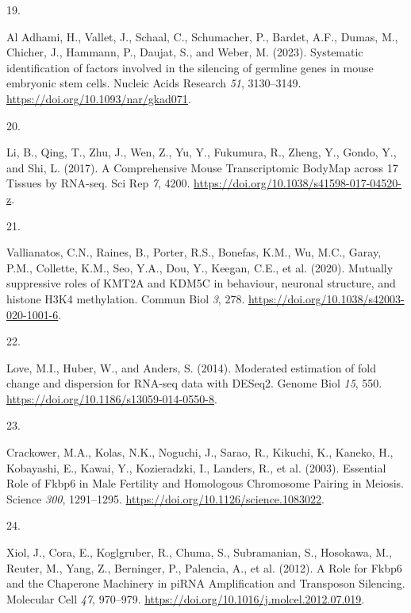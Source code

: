 \documentclass[
]{article}
\newlength{\cslhangindent}
\newlength{\csllabelwidth}
\newlength{\cslentryspacingunit} %
\newenvironment{CSLReferences}[2] %
 {%
  \setlength{\parindent}{0pt}
  \ifodd #1
  \let\oldpar\par
  \def\par{\hangindent=\cslhangindent\oldpar}
  \fi
  \setlength{\parskip}{#2\cslentryspacingunit}
 }%
 {}
\newcommand{\CSLLeftMargin}[1]{\parbox[t]{\csllabelwidth}{#1}}
\newcommand{\CSLRightInline}[1]{\parbox[t]{\linewidth - \csllabelwidth}{#1}\break}
\begin{document}
\begin{CSLReferences}{0}{0}
\leavevmode{}%
\CSLLeftMargin{19. }%
\CSLRightInline{Al Adhami, H., Vallet, J., Schaal, C., Schumacher, P.,
Bardet, A.F., Dumas, M., Chicher, J., Hammann, P., Daujat, S., and
Weber, M. (2023). Systematic identification of factors involved in the
silencing of germline genes in mouse embryonic stem cells. Nucleic Acids
Research \emph{51}, 3130--3149.
\url{https://doi.org/10.1093/nar/gkad071}.}

\leavevmode{}%
\CSLLeftMargin{20. }%
\CSLRightInline{Li, B., Qing, T., Zhu, J., Wen, Z., Yu, Y., Fukumura,
R., Zheng, Y., Gondo, Y., and Shi, L. (2017). A {Comprehensive Mouse
Transcriptomic BodyMap} across 17 {Tissues} by {RNA-seq}. Sci Rep
\emph{7}, 4200. \url{https://doi.org/10.1038/s41598-017-04520-z}.}

\leavevmode{}%
\CSLLeftMargin{21. }%
\CSLRightInline{Vallianatos, C.N., Raines, B., Porter, R.S., Bonefas,
K.M., Wu, M.C., Garay, P.M., Collette, K.M., Seo, Y.A., Dou, Y., Keegan,
C.E., et al. (2020). Mutually suppressive roles of {KMT2A} and {KDM5C}
in behaviour, neuronal structure, and histone {H3K4} methylation. Commun
Biol \emph{3}, 278. \url{https://doi.org/10.1038/s42003-020-1001-6}.}

\leavevmode{}%
\CSLLeftMargin{22. }%
\CSLRightInline{Love, M.I., Huber, W., and Anders, S. (2014). Moderated
estimation of fold change and dispersion for {RNA-seq} data with
{DESeq2}. Genome Biol \emph{15}, 550.
\url{https://doi.org/10.1186/s13059-014-0550-8}.}

\leavevmode{}%
\CSLLeftMargin{23. }%
\CSLRightInline{Crackower, M.A., Kolas, N.K., Noguchi, J., Sarao, R.,
Kikuchi, K., Kaneko, H., Kobayashi, E., Kawai, Y., Kozieradzki, I.,
Landers, R., et al. (2003). Essential {Role} of {Fkbp6} in {Male
Fertility} and {Homologous Chromosome Pairing} in {Meiosis}. Science
\emph{300}, 1291--1295. \url{https://doi.org/10.1126/science.1083022}.}

\leavevmode{}%
\CSLLeftMargin{24. }%
\CSLRightInline{Xiol, J., Cora, E., Koglgruber, R., Chuma, S.,
Subramanian, S., Hosokawa, M., Reuter, M., Yang, Z., Berninger, P.,
Palencia, A., et al. (2012). A {Role} for {Fkbp6} and the {Chaperone
Machinery} in {piRNA Amplification} and {Transposon Silencing}.
Molecular Cell \emph{47}, 970--979.
\url{https://doi.org/10.1016/j.molcel.2012.07.019}.}


\end{CSLReferences}
\end{document}
